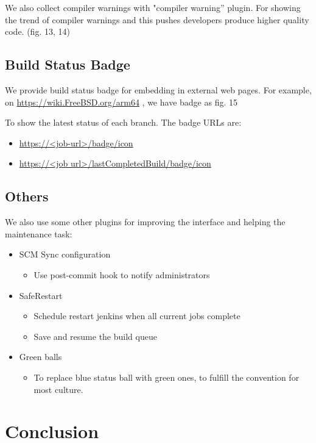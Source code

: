 \documentclass[a4paper,twocolumn,10pt]{article}
\begin{document}
We also collect compiler warnings with "compiler warning” plugin. For showing
the trend of compiler warnings and this pushes developers produce higher
quality code. (fig. 13, 14)

\subsection{Build Status Badge}

We provide build status badge for embedding in external web pages. For example,
on \url{https://wiki.FreeBSD.org/arm64} , we have badge as fig. 15

To show the latest status of each branch. The badge URLs are:
\begin{itemize}
\item \url{https://<job-url>/badge/icon}
\item \url{https://<job url>/lastCompletedBuild/badge/icon}
\end{itemize}

\subsection{Others}

We also use some other plugins for improving the interface and helping the
maintenance task:

\begin{itemize}
\item SCM Sync configuration
  \begin{itemize}
  \item Use post-commit hook to notify administrators
  \end{itemize}
\item SafeRestart
  \begin{itemize}
  \item Schedule restart jenkins when all current jobs complete
  \item Save and resume the build queue
  \end{itemize}
\item Green balls
  \begin{itemize}
  \item To replace blue status ball with green ones, to fulfill the convention
        for most culture.
  \end{itemize}
\end{itemize}

\section{Conclusion}
\end{document}
